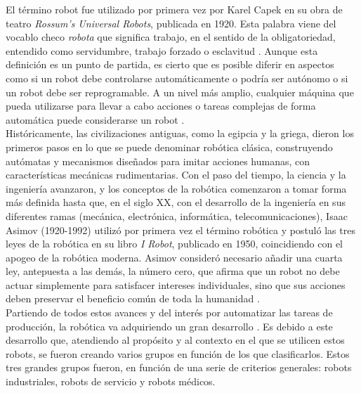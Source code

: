 El término robot fue utilizado por primera vez por Karel Capek en su obra de teatro \textit{Rossum’s Universal Robots}, publicada en 1920. Esta palabra viene del vocablo checo \textit{robota} que significa trabajo, en el sentido de la obligatoriedad, entendido como servidumbre, trabajo forzado o esclavitud \cite{Sanchez07a}. Aunque esta definición es un punto de partida, es cierto que es posible diferir en aspectos como si un robot debe controlarse automáticamente o podría ser autónomo o si un robot debe ser reprogramable. A un nivel más amplio, cualquier máquina que pueda utilizarse para llevar a cabo acciones o tareas complejas de forma automática puede considerarse un robot \cite{Raj19}.\\

Históricamente, las civilizaciones antiguas, como la egipcia y la griega, dieron los primeros pasos en lo que se puede denominar robótica clásica, construyendo autómatas y mecanismos diseñados para imitar acciones humanas, con características mecánicas rudimentarias. 
Con el paso del tiempo, la ciencia y la ingeniería avanzaron, y los conceptos de la robótica comenzaron a tomar forma más definida hasta que, en el siglo XX, con el desarrollo de la ingeniería en sus diferentes ramas (mecánica, electrónica, informática, telecomunicaciones), Isaac Asimov (1920-1992) utilizó por primera vez el término robótica y postuló las tres leyes de la robótica en su libro \textit{I Robot}, publicado en 1950, coincidiendo con el apogeo de la robótica moderna. Asimov consideró necesario añadir una cuarta ley, antepuesta a las demás, la número cero, que afirma que un robot no debe actuar simplemente para satisfacer intereses individuales, sino que sus acciones deben preservar el beneficio común de toda la humanidad \cite{Sanchez07b}.\\


Partiendo de todos estos avances y del interés por automatizar las tareas de producción, la robótica va adquiriendo un gran desarrollo \cite{Sanchez07b}. Es debido a este desarrollo que, atendiendo al propósito y al contexto en el que se utilicen estos robots, se fueron creando varios grupos en función de los que clasificarlos. Estos tres grandes grupos fueron, en función de una serie de criterios generales: robots industriales, robots de servicio y robots médicos.

